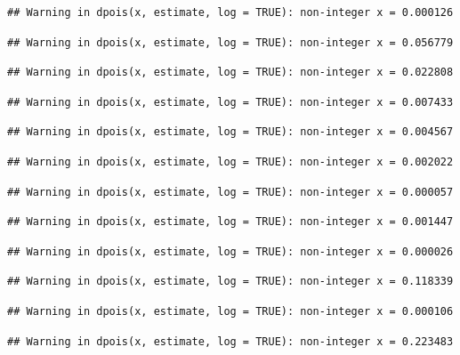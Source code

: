 \documentclass[]{article}
\begin{document}
\begin{verbatim}
## Warning in dpois(x, estimate, log = TRUE): non-integer x = 0.000126
\end{verbatim}

\begin{verbatim}
## Warning in dpois(x, estimate, log = TRUE): non-integer x = 0.056779
\end{verbatim}

\begin{verbatim}
## Warning in dpois(x, estimate, log = TRUE): non-integer x = 0.022808
\end{verbatim}

\begin{verbatim}
## Warning in dpois(x, estimate, log = TRUE): non-integer x = 0.007433
\end{verbatim}

\begin{verbatim}
## Warning in dpois(x, estimate, log = TRUE): non-integer x = 0.004567
\end{verbatim}

\begin{verbatim}
## Warning in dpois(x, estimate, log = TRUE): non-integer x = 0.002022
\end{verbatim}

\begin{verbatim}
## Warning in dpois(x, estimate, log = TRUE): non-integer x = 0.000057
\end{verbatim}

\begin{verbatim}
## Warning in dpois(x, estimate, log = TRUE): non-integer x = 0.001447
\end{verbatim}

\begin{verbatim}
## Warning in dpois(x, estimate, log = TRUE): non-integer x = 0.000026
\end{verbatim}

\begin{verbatim}
## Warning in dpois(x, estimate, log = TRUE): non-integer x = 0.118339
\end{verbatim}

\begin{verbatim}
## Warning in dpois(x, estimate, log = TRUE): non-integer x = 0.000106
\end{verbatim}

\begin{verbatim}
## Warning in dpois(x, estimate, log = TRUE): non-integer x = 0.223483
\end{verbatim}
\end{document}
